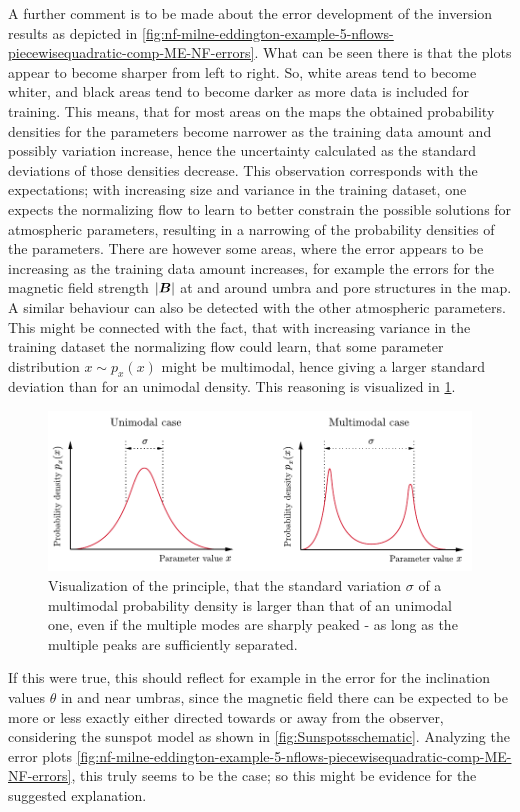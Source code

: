 \documentclass[a4paper,12pt]{report}
\begin{document}
A further comment is to be made about the error development of the inversion results as depicted in \cref{fig:nf-milne-eddington-example-5-nflows-piecewisequadratic-comp-ME-NF-errors}. What can be seen there is that the plots appear to become sharper from left to right. So, white areas tend to become whiter, and black areas tend to become darker as more data is included for training. This means, that for most areas on the maps the obtained probability densities for the parameters become narrower as the training data amount and possibly variation increase, hence the uncertainty calculated as the standard deviations of those densities decrease. This observation corresponds with the expectations; with increasing size and variance in the training dataset, one expects the normalizing flow to learn to better constrain the possible solutions for atmospheric parameters, resulting in a narrowing of the probability densities of the parameters. There are however some areas, where the error appears to be increasing as the training data amount increases, for example the errors for the magnetic field strength $|\bm{B}|$ at and around umbra and pore structures in the map. A similar behaviour can also be detected with the other atmospheric parameters. This might be connected with the fact, that with increasing variance in the training dataset the normalizing flow could learn, that some parameter distribution $x \sim p_x(x)$ might be multimodal, hence giving a larger standard deviation than for an unimodal density. This reasoning is visualized in \cref{fig:unimodal_multimodal}.
\begin{figure}[h!]
\centering
\includegraphics[width=\textwidth-3cm]{figures/unimodal_multimodal.pdf}
\caption{Visualization of the principle, that the standard variation $\sigma$ of a multimodal probability density is larger than that of an unimodal one, even if the multiple modes are sharply peaked - as long as the multiple peaks are sufficiently separated.}
\label{fig:unimodal_multimodal}
\end{figure}
If this were true, this should reflect for example in the error for the inclination values $\theta$ in and near umbras, since the magnetic field there can be expected to be more or less exactly either directed towards or away from the observer, considering the sunspot model as shown in \cref{fig:Sunspotsschematic}. Analyzing the error plots \cref{fig:nf-milne-eddington-example-5-nflows-piecewisequadratic-comp-ME-NF-errors}, this truly seems to be the case; so this might be evidence for the suggested explanation.
\end{document}
